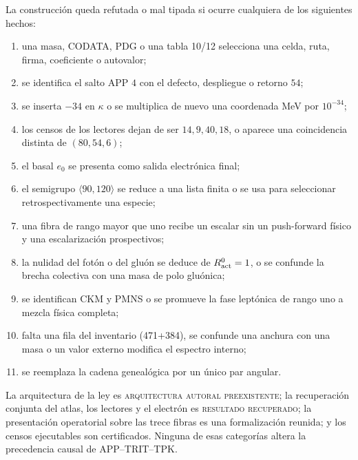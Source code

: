 \begin{falsifier}
\label{10j-falsador-ley-masas}
La construcción queda refutada o mal tipada si ocurre cualquiera de los
siguientes hechos:
\begin{enumerate}
 \item una masa, CODATA, PDG o una tabla 10/12 selecciona una celda, ruta,
 firma, coeficiente o autovalor;
 \item se identifica el salto APP \(4\) con el defecto, despliegue o retorno
 \(54\);
 \item se inserta \(-34\) en \(\kappa\) o se multiplica de nuevo una
 coordenada MeV por \(10^{-34}\);
 \item los censos de los lectores dejan de ser \(14,9,40,18\), o aparece una
 coincidencia distinta de \((80,54,6)\);
 \item el basal \(e_0\) se presenta como salida electrónica final;
 \item el semigrupo \(\langle90,120\rangle\) se reduce a una lista finita o
 se usa para seleccionar retrospectivamente una especie;
 \item una fibra de rango mayor que uno recibe un escalar sin un push-forward
 físico y una escalarización prospectivos;
 \item la nulidad del fotón o del gluón se deduce de
 \(R_{\rm act}^{0}=1\), o se confunde la brecha colectiva con una masa de
 polo gluónica;
 \item se identifican CKM y PMNS o se promueve la fase leptónica de rango uno
 a mezcla física completa;
 \item falta una fila del inventario (471+384), se confunde una anchura con
 una masa o un valor externo modifica el espectro interno;
 \item se reemplaza la cadena genealógica por un único par angular.
\end{enumerate}
\end{falsifier}

La arquitectura de la ley es
\textsc{arquitectura autoral preexistente}; la recuperación conjunta del
atlas, los lectores y el electrón es \textsc{resultado recuperado}; la
presentación operatorial sobre las trece fibras es una formalización reunida;
y los censos ejecutables son certificados. Ninguna de esas categorías altera
la precedencia causal de APP--TRIT--TPK.

